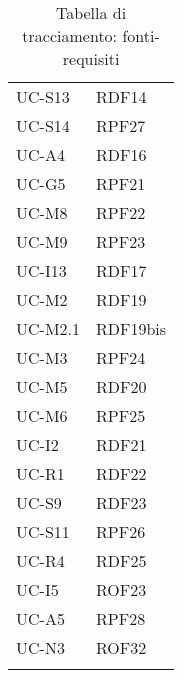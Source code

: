\begin{longtable}{| p{5cm} | p{5cm} |}
		\rowcolor{LightGray}
		UC-S13 & RDF14\\
		UC-S14 & RPF27\\
		\rowcolor{LightGray}
		UC-A4 & RDF16\\
		UC-G5 & RPF21\\
		\rowcolor{LightGray}
		UC-M8 & RPF22\\
		UC-M9 & RPF23\\
		\rowcolor{LightGray}
		UC-I13 & RDF17 \\
		UC-M2 & RDF19 \\
		UC-M2.1 & RDF19bis \\
		\rowcolor{LightGray}
		UC-M3 & RPF24 \\
		UC-M5 & RDF20 \\
		\rowcolor{LightGray}
		UC-M6 & RPF25 \\
		UC-I2 & RDF21 \\
		\rowcolor{LightGray}
		UC-R1 & RDF22 \\
		UC-S9 & RDF23 \\
		\rowcolor{LightGray}
		UC-S11 & RPF26 \\
		UC-R4 & RDF25\\
		\rowcolor{LightGray}
		UC-I5 & ROF23\\
		UC-A5 & RPF28\\
		\rowcolor{LightGray}
		UC-N3 & ROF32\\
		\hline
		\caption{Tabella di tracciamento: fonti-requisiti}
\end{longtable}
\newpage
